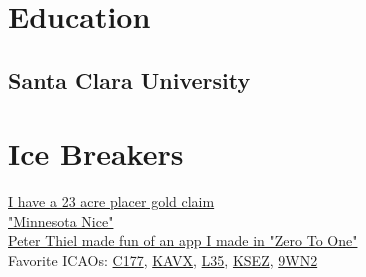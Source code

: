 \documentclass[]{plushcv}
\begin{document}
\begin{minipage}[t]{0.25\textwidth}


\section{Education} 
\subsection{Santa Clara University}

\section{Ice Breakers}
\href{https://romanch.uk/serve/images/claim}{I have a 23 acre placer gold claim} \\
\sectionsep
\href{https://www.youtube.com/watch?v=oiSzwoJr4-0}{"Minnesota Nice"} \\
\sectionsep
\href{https://books.google.com/books?id=Owc2nQEACAAJ&pg=PA75&source=gbs_selected_pages&cad=3#v=onepage&q=toilet+paper&f=false}{Peter Thiel made fun of an app I made in "Zero To One"} \\
\sectionsep
Favorite ICAOs: \href{https://romanch.uk/serve/images/c177-at-ksez}{C177}, \href{https://romanch.uk/serve/videos/avx-master-m3u8}{KAVX}, \href{https://romanch.uk/serve/videos/l35-master-m3u8}{L35}, \href{https://www.airnav.com/airport/KSEZ}{KSEZ}, \href{https://romanch.uk/serve/images/9wn2-airport}{9WN2}


\end{minipage} 
\end{document}
